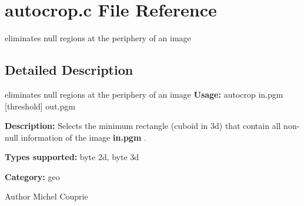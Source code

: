 \section{autocrop.c File Reference}
\label{autocrop_8c}


eliminates null regions at the periphery of an image  




\subsection{Detailed Description}
eliminates null regions at the periphery of an image {\bfseries Usage:} autocrop in.pgm [threshold] out.pgm

{\bfseries Description:} Selects the minimum rectangle (cuboid in 3d) that contain all non-\/null information of the image {\bfseries in.pgm} .

{\bfseries Types supported:} byte 2d, byte 3d

{\bfseries Category:} geo

\begin{DoxyAuthor}{Author}
Michel Couprie 
\end{DoxyAuthor}
